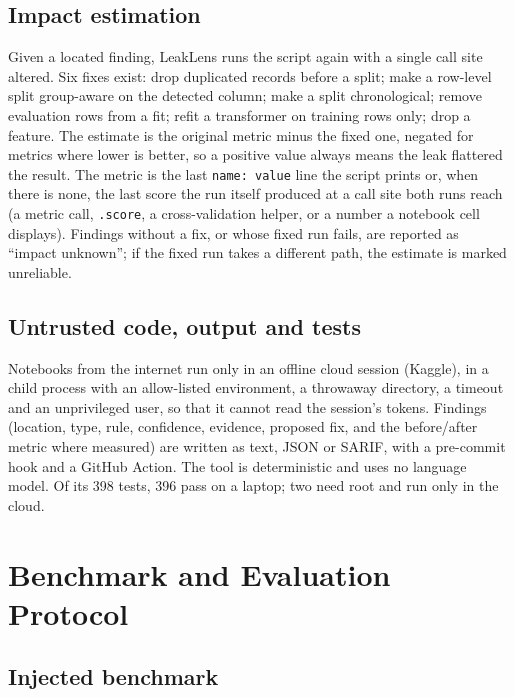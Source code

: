 \documentclass[10pt,a4paper,twocolumn]{article}
\newcommand{\tool}{LeakLens}
\newcommand{\code}[1]{\texttt{#1}}
\begin{document}
\subsection{Impact estimation}

Given a located finding, \tool{} runs the script again with a single call site altered. Six fixes exist: drop duplicated
records before a split; make a row-level split group-aware on the detected column; make a split chronological;
remove evaluation rows from a fit; refit a transformer on training rows only; drop a feature. The estimate is the
original metric minus the fixed one, negated for metrics where lower is better, so a positive value always means
the leak flattered the result. The metric is the last \code{name: value} line the script prints or, when there is
none, the last score the run itself produced at a call site both runs reach (a metric call, \code{.score}, a
cross-validation helper, or a number a notebook cell displays). Findings without a fix, or whose fixed run fails,
are reported as ``impact unknown''; if the fixed run takes a different path, the estimate is marked unreliable.

\subsection{Untrusted code, output and tests}

Notebooks from the internet run only in an offline cloud session (Kaggle), in a child process with an allow-listed
environment, a throwaway directory, a timeout and an unprivileged user, so that it cannot read the session's
tokens. Findings (location, type, rule, confidence, evidence, proposed fix, and the before/after metric where
measured) are written as text, JSON or SARIF, with a pre-commit hook and a GitHub Action. The tool is deterministic
and uses no language model. Of its 398 tests, 396 pass on a laptop; two need root and run only in the cloud.

\section{Benchmark and Evaluation Protocol}

\subsection{Injected benchmark}
\end{document}

